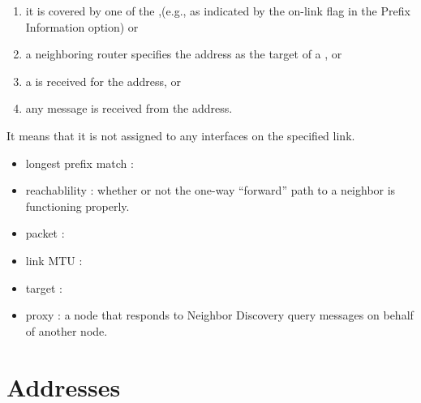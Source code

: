 \begin{itemize}
{    \begin{enumerate}
    \item it is covered by one of the ,(e.g., as indicated
      by the on-link flag in the Prefix Information option) or
    \item a neighboring router specifies the address as the target of a , or
    \item a  is received for the address, or
    \item any  message is received from the address.
    \end{enumerate}

     It means
    that it is not assigned to any interfaces on the specified link.
  }
\end{itemize}



\begin{itemize}
\item longest prefix match : 
\item reachablility : whether or not the one-way ``forward'' path to a neighbor
  is functioning properly. 
\item packet : 
\item link MTU : 
\item target : 
\item proxy : a node that responds to Neighbor Discovery query messages on
  behalf of another node. 
\end{itemize}

\section{Addresses}



